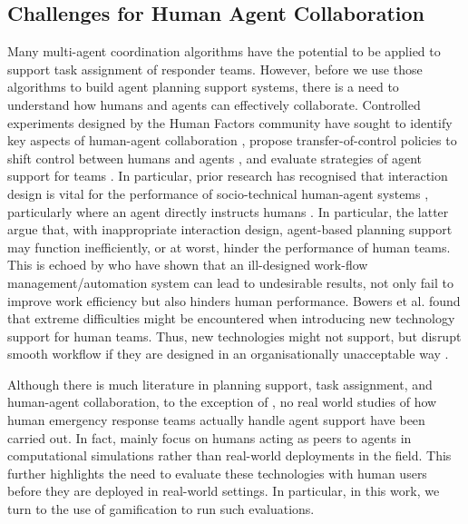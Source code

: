 \subsection{Challenges for Human Agent Collaboration}\label{sec:challenges}
Many multi-agent coordination algorithms have the potential to be applied to support task assignment of responder teams. However, before we use those algorithms to build agent planning support systems, there is a need to understand how humans and agents can effectively collaborate.  Controlled experiments designed by the Human Factors community have sought to identify key aspects of human-agent collaboration \cite{Bradshaw2011,Cooke2006,Sukthankar,Wagner2004}, propose transfer-of-control policies to shift control between humans and agents \cite{scerri:etal:2005},  and evaluate strategies of agent support for teams \cite{Lenox2000}. In particular, prior research has recognised that interaction design is vital for the performance of socio-technical human-agent systems \cite{Rachlin1997}, particularly where an agent directly instructs humans \cite{Moran2013}. In particular, the latter argue that, with inappropriate interaction design, agent-based planning support may function inefficiently, or at worst, hinder the performance of human teams.  This is echoed by \cite{Bowers1994} who have shown that an ill-designed work-flow management/automation system can lead to undesirable results, not only fail to improve work efficiency but also hinders human performance. Bowers et al. found that extreme difficulties might be encountered when introducing new technology support for human teams. Thus,  new technologies might not support, but  disrupt smooth workflow if they are designed in an organisationally unacceptable way \cite{Abbott1994}. 

Although there is much literature in planning support, task assignment, and human-agent collaboration, to the exception of \cite{schurr2005defacto,scerri:etal:2003}, no real world studies of how human emergency response teams  actually handle agent support  have been carried out.  In fact, \cite{schurr2005defacto,scerri:etal:2003} mainly focus on humans acting as peers to agents in computational simulations rather than real-world deployments in the field. This further highlights the need to evaluate these technologies with human users before they are deployed in real-world settings. In particular, in this work, we turn to the use of gamification to run such evaluations. 


